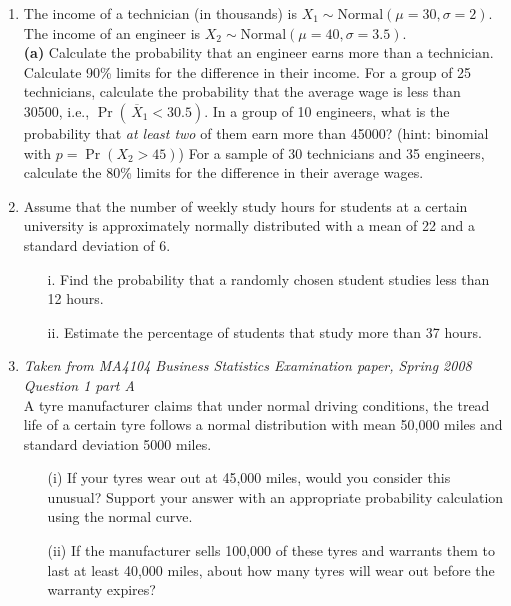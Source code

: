\documentclass[]{article}
\begin{document}
\begin{enumerate}
	\item The income of a technician (in thousands) is $X_1 \sim \text{Normal}(\mu=30,\sigma=2)$. The income of an engineer is $X_2 \sim \text{Normal}(\mu=40,\sigma=3.5)$. \\[-0.2cm]
	
	{\bf(a)} Calculate the probability that an engineer earns more than a technician.  Calculate 90\% limits for the difference in their income.  For a group of 25 technicians, calculate the probability that the average wage is less than 30500, i.e., $\Pr(\,\overline{\!X}_1 < 30.5)$.  In a group of 10 engineers, what is the probability that \emph{at least two} of them earn more than 45000? (hint: binomial with $p = \Pr(X_2 > 45)$)  For a sample of 30 technicians and 35 engineers, calculate the 80\% limits for the difference in their average wages.
	
	\item Assume that the number of weekly study hours for students at a certain university is approximately normally distributed with a mean of 22 and a standard deviation of 6.
	
	\begin{itemize}
		\item[i.] Find the probability that a randomly chosen student studies less than 12 hours.
		\item[ii.] Estimate the percentage of students that study more than 37 hours.
	\end{itemize}
	\item \emph{Taken from MA4104 Business Statistics Examination paper, Spring 2008 Question 1 part A}\\
	
	
	A tyre manufacturer claims that under normal driving conditions, the tread life of a certain tyre follows a normal distribution with mean 50,000 miles and standard deviation 5000 miles.
	
	\begin{itemize}
		\item [(i)] If your tyres wear out at 45,000 miles, would you consider this unusual? Support your answer with an appropriate probability calculation using the normal curve. %
		
		\item [(ii)] If the manufacturer sells 100,000 of these tyres and warrants them to last at least 40,000 miles, about how many tyres will wear out before the warranty expires?%
	\end{itemize}
	

\end{enumerate}
\end{document}
